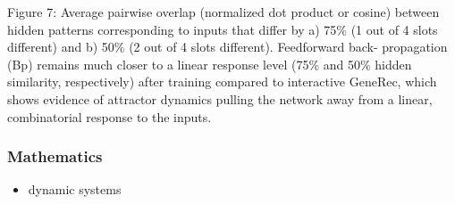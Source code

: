 Figure 7: Average pairwise overlap (normalized dot product or cosine) between hidden patterns corresponding to
inputs that differ by a) 75\% (1 out of 4 slots different) and b) 50\% (2 out of 4 slots different). Feedforward back-
propagation (Bp) remains much closer to a linear response level (75\% and 50\% hidden similarity, respectively) after
training compared to interactive GeneRec, which shows evidence of attractor dynamics pulling the network away from
a linear, combinatorial response to the inputs.

\subsubsection{Mathematics} 
\begin{itemize} 
\item dynamic systems 
\end{itemize}

